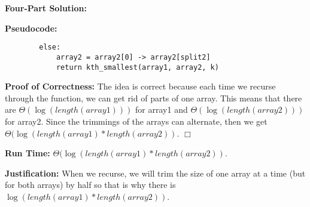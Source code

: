 \documentclass[11pt]{article}
\def\endproofmark{$\Box$}
\newenvironment{FourPartSolution}{\par{\bf Four-Part Solution:}}{\smallskip}
\newenvironment{pseudocode}{\par{\bf Pseudocode:}}{\smallskip}
\newenvironment{proofOfCorrectness}{\par{\bf Proof of Correctness:}}{\endproofmark\smallskip}
\newenvironment{runTime}{\par{\bf Run Time:}}{\smallskip}
\newenvironment{justification}{\par{\bf Justification:}}{\smallskip}
\begin{document}
\begin{FourPartSolution}
\begin{pseudocode}
\begin{lstlisting}
		else:
			array2 = array2[0] -> array2[split2]
			return kth_smallest(array1, array2, k)
\end{lstlisting}
\end{pseudocode}
\begin{proofOfCorrectness}
The idea is correct because each time we recurse through the function, we can get rid of parts of one array. This means that there are $\Theta(\log{(length(array1))})$ for array1 and $\Theta(\log{(length(array2))})$ for array2. Since the trimmings of the arrays can alternate, then we get $\Theta(\log{(length(array1) * length(array2))}$.
\end{proofOfCorrectness}
\begin{runTime}
$\Theta(\log{(length(array1) * length(array2))}$.
\end{runTime}
\begin{justification}
When we recurse, we will trim the size of one array at a time (but for both arrays) by half so that is why there is $\log{(length(array1) * length(array2))}$.
\end{justification}
\end{FourPartSolution}



\newpage
\end{document}
